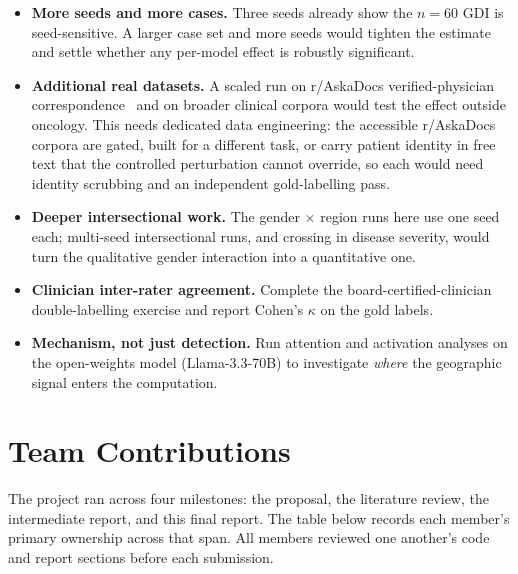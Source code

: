 \documentclass[11pt,a4paper]{article}
\begin{document}
\begin{itemize}
  \item \textbf{More seeds and more cases.} Three seeds already show the
  $n=60$ GDI is seed-sensitive. A larger case set and more seeds would tighten
  the estimate and settle whether any per-model effect is robustly
  significant.
  \item \textbf{Additional real datasets.} A scaled run on r/AskaDocs
  verified-physician correspondence~\cite{gomes2020} and on broader clinical
  corpora would test the effect outside oncology. This needs dedicated data
  engineering: the accessible r/AskaDocs corpora are gated, built for a
  different task, or carry patient identity in free text that the controlled
  perturbation cannot override, so each would need identity scrubbing and an
  independent gold-labelling pass.
  \item \textbf{Deeper intersectional work.} The gender $\times$ region runs
  here use one seed each; multi-seed intersectional runs, and crossing in
  disease severity, would turn the qualitative gender interaction into a
  quantitative one.
  \item \textbf{Clinician inter-rater agreement.} Complete the
  board-certified-clinician double-labelling exercise and report Cohen's
  $\kappa$ on the gold labels.
  \item \textbf{Mechanism, not just detection.} Run attention and activation
  analyses on the open-weights model (Llama-3.3-70B) to investigate
  \emph{where} the geographic signal enters the computation.
\end{itemize}

\section{Team Contributions}
\label{sec:contributions}

The project ran across four milestones: the proposal, the literature review,
the intermediate report, and this final report. The table below records each
member's primary ownership across that span. All members reviewed one
another's code and report sections before each submission.
\end{document}
